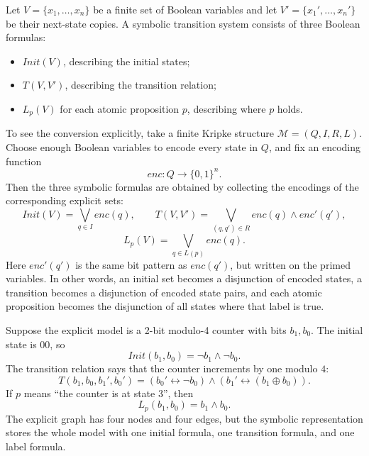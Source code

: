 \begin{definition}
Let $V = \{x_1,\dots,x_n\}$ be a finite set of Boolean variables and let
$V' = \{x_1',\dots,x_n'\}$ be their next-state copies.  A symbolic transition
system consists of three Boolean formulas:
\begin{itemize}
  \item $Init(V)$, describing the initial states;
  \item $T(V,V')$, describing the transition relation;
  \item $L_p(V)$ for each atomic proposition $p$, describing where $p$ holds.
\end{itemize}
\end{definition}

To see the conversion explicitly, take a finite Kripke structure
$\mathcal{M} = (Q, I, R, L)$.  Choose enough Boolean variables to encode every
state in $Q$, and fix an encoding function
\[
  enc : Q \to \{0,1\}^n.
\]
Then the three symbolic formulas are obtained by collecting the encodings of
the corresponding explicit sets:
\[
  Init(V) = \bigvee_{q \in I} enc(q),
  \qquad
  T(V,V') = \bigvee_{(q,q') \in R} enc(q) \land enc'(q'),
\]
\[
  L_p(V) = \bigvee_{q \in L(p)} enc(q).
\]
Here $enc'(q')$ is the same bit pattern as $enc(q')$, but written on the
primed variables.  In other words, an initial set becomes a disjunction of
encoded states, a transition becomes a disjunction of encoded state pairs, and
each atomic proposition becomes the disjunction of all states where that label
is true.

\begin{example}
Suppose the explicit model is a 2-bit modulo-4 counter with bits
$b_1,b_0$.  The initial state is $00$, so
\[
  Init(b_1,b_0) = \neg b_1 \land \neg b_0.
\]
The transition relation says that the counter increments by one modulo $4$:
\[
  T(b_1,b_0,b_1',b_0') =
    (b_0' \leftrightarrow \neg b_0)
    \land
    (b_1' \leftrightarrow (b_1 \oplus b_0)).
\]
If $p$ means ``the counter is at state $3$'', then
\[
  L_p(b_1,b_0) = b_1 \land b_0.
\]
The explicit graph has four nodes and four edges, but the symbolic
representation stores the whole model with one initial formula, one transition
formula, and one label formula.
\end{example}

